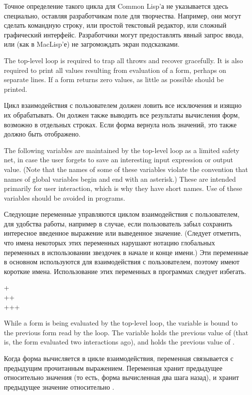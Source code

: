 Точное определение такого цикла для Common Lisp'а не указывается здесь
специально, оставляя разработчикам поле для творчества.
Например, они могут сделать командную строку, или простой текстовый редактор,
или сложный графический интерфейс. Разработчики могут предоставлять явный запрос
ввода, или (как в MacLisp'е) не загромождать экран подсказками.

The top-level loop is required to trap all throws and recover gracefully.
It is also required to print all values resulting from evaluation of a form,
perhaps on separate lines.  If a form returns zero values, as little
as possible should be printed.

Цикл взаимодействия с пользователем должен ловить все исключения и изящно их
обрабатывать. Он должен также выводить все результаты вычисления форм, возможно
в отдельных строках. Если форма вернула ноль значений, это также должно быть
отображено.

The following variables are maintained by the top-level loop
as a limited safety net, in case the user forgets to save an interesting input
expression or output value.  (Note that the names of some of these variables
violate the convention that names of global variables begin and end with
an asterisk.)  These are intended primarily for user interaction, which is why
they have short names.  Use of these variables should be avoided in programs.

Следующие переменные управляются циклом взаимодействия с пользователем, для
удобства работы, например в случае, если пользователь забыл сохранить
интересное введенное выражение или выведенное значение. (Следует отметить, что
имена некоторых этих переменных нарушают нотацию глобальных переменных в
использовании звездочек в начале и конце имени.) Эти переменные в основном
используются для взаимодействия с пользователем, поэтому имеют короткие
имена. Использование этих переменных в программах следует избегать.

\begin{defun}[Variable]
+ \\
++ \\
+++ 

While a form is being evaluated by the top-level loop,
the variable \cdf{+} is bound to the previous form read by the loop.
The variable \cdf{++} holds the previous value of \cdf{+} (that is, the form
evaluated two interactions ago), and \cdf{+++} holds the previous value
of \cdf{++}.

Когда форма вычисляется в цикле взаимодействия, переменная \cdf{+} связывается с
предыдущим прочитанным выражением.
Переменная \cdf{++} хранит предыдущее относительно значения \cdf{+} (то есть,
форма вычисленная два шага назад), и \cdf{+++} хранит предыдущее значение
относительно \cdf{++}.
\end{defun}

